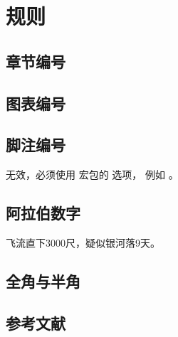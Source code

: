 \chapter{规则}


\section{章节编号}

\section{图表编号}
\section{脚注编号}
\begin{Code}
\end{Code}
无效，必须使用  宏包的  选项，
例如 。

\section{阿拉伯数字}

飞流直下3000尺，疑似银河落9天。

\section{全角与半角}

\section{参考文献}

